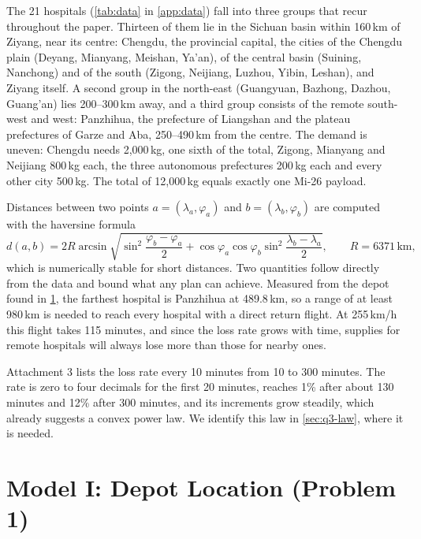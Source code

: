\documentclass[11pt,a4paper]{article}
\theoremstyle{definition}
\newcommand{\km}{\,\mathrm{km}}
\begin{document}
The 21 hospitals (\cref{tab:data} in \cref{app:data}) fall into three groups that recur throughout the paper.
Thirteen of them lie in the Sichuan basin within 160\,km of Ziyang, near its centre: Chengdu, the provincial capital, the cities of the Chengdu plain (Deyang, Mianyang, Meishan, Ya'an), of the central basin (Suining, Nanchong) and of the south (Zigong, Neijiang, Luzhou, Yibin, Leshan), and Ziyang itself.
A second group in the north-east (Guangyuan, Bazhong, Dazhou, Guang'an) lies 200--300\,km away, and a third group consists of the remote south-west and west: Panzhihua, the prefecture of Liangshan and the plateau prefectures of Garze and Aba, 250--490\,km from the centre.
The demand is uneven: Chengdu needs 2{,}000\,kg, one sixth of the total, Zigong, Mianyang and Neijiang 800\,kg each, the three autonomous prefectures 200\,kg each and every other city 500\,kg.
The total of 12{,}000\,kg equals exactly one Mi-26 payload.

Distances between two points $a=(\lambda_a,\varphi_a)$ and $b=(\lambda_b,\varphi_b)$ are computed with the haversine formula
\begin{equation}\label{eq:haversine}
d(a,b) = 2R\arcsin\sqrt{\sin^2\frac{\varphi_b-\varphi_a}{2}+\cos\varphi_a\cos\varphi_b\sin^2\frac{\lambda_b-\lambda_a}{2}}, \qquad R=6371\km ,
\end{equation}
which is numerically stable for short distances.
Two quantities follow directly from the data and bound what any plan can achieve.
Measured from the depot found in \cref{sec:q1}, the farthest hospital is Panzhihua at 489.8\,km, so a range of at least 980\,km is needed to reach every hospital with a direct return flight.
At 255\,km/h this flight takes 115 minutes, and since the loss rate grows with time, supplies for remote hospitals will always lose more than those for nearby ones.

Attachment 3 lists the loss rate every 10 minutes from 10 to 300 minutes.
The rate is zero to four decimals for the first 20 minutes, reaches 1\% after about 130 minutes and 12\% after 300 minutes, and its increments grow steadily, which already suggests a convex power law.
We identify this law in \cref{sec:q3-law}, where it is needed.

\section{Model I: Depot Location (Problem 1)}\label{sec:q1}
\end{document}
